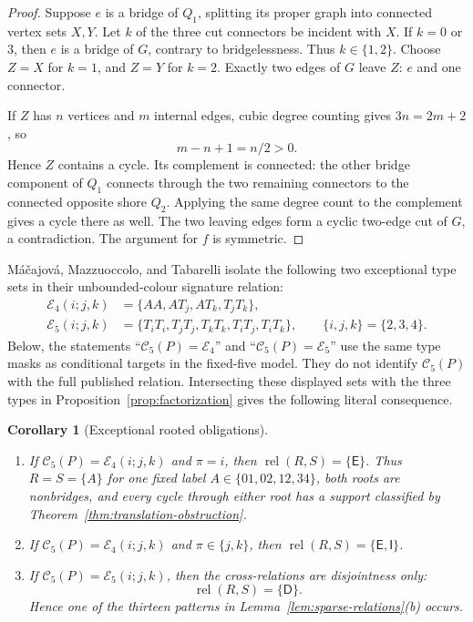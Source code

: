 \documentclass[11pt]{article}
\newtheorem{corollary}[theorem]{Corollary}
\theoremstyle{definition}
\theoremstyle{remark}
\begin{document}
\begin{proof}
Suppose \(e\) is a bridge of \(Q_1\), splitting its proper graph into
connected vertex sets \(X,Y\).  Let \(k\) of the three cut connectors
be incident with \(X\).  If \(k=0\) or \(3\), then \(e\) is a bridge of
\(G\), contrary to bridgelessness.  Thus \(k\in\{1,2\}\).  Choose
\(Z=X\) for \(k=1\), and \(Z=Y\) for \(k=2\).  Exactly two edges of
\(G\) leave \(Z\): \(e\) and one connector.

If \(Z\) has \(n\) vertices and \(m\) internal edges, cubic degree
counting gives \(3n=2m+2\), so
\[
 m-n+1=n/2>0.
\]
Hence \(Z\) contains a cycle.  Its complement is connected: the other
bridge component of \(Q_1\) connects through the two remaining
connectors to the connected opposite shore \(Q_2\).  Applying the same
degree count to the complement gives a cycle there as well.  The two
leaving edges form a cyclic two-edge cut of \(G\), a contradiction.
The argument for \(f\) is symmetric.
\end{proof}

M\'a\v cajov\'a, Mazzuoccolo, and Tabarelli
\cite{MacajovaEtAl2026} isolate the following two exceptional type sets
in their unbounded-colour signature relation:
\begin{equation}
\begin{aligned}
\mathcal E_4(i;j,k)&=\{AA,AT_j,AT_k,T_jT_k\},\\
\mathcal E_5(i;j,k)&=\{T_iT_i,T_jT_j,T_kT_k,T_iT_j,T_iT_k\},
 \qquad\{i,j,k\}=\{2,3,4\}.
\end{aligned}
\tag{6.10}
\end{equation}
Below, the statements ``\(\mathcal C_5(P)=\mathcal E_4\)'' and
``\(\mathcal C_5(P)=\mathcal E_5\)'' use the same type masks as
conditional targets in the fixed-five model.  They do not identify
\(\mathcal C_5(P)\) with the full published relation.
Intersecting these displayed sets with the three types in
Proposition~\ref{prop:factorization} gives the following literal
consequence.

\begin{corollary}[Exceptional rooted obligations]
\label{cor:exceptional-rooted}
\begin{enumerate}[label=(\roman*),leftmargin=2.4em]
\item If \(\mathcal C_5(P)=\mathcal E_4(i;j,k)\) and
\(\pi=i\), then
\(\operatorname{rel}(R,S)=\{\mathsf E\}\).  Thus
\(R=S=\{A\}\) for one fixed label
\(A\in\{01,02,12,34\}\), both roots are nonbridges, and every cycle
through either root has a support classified by
Theorem~\ref{thm:translation-obstruction}.
\item If \(\mathcal C_5(P)=\mathcal E_4(i;j,k)\) and
\(\pi\in\{j,k\}\), then
\(\operatorname{rel}(R,S)=\{\mathsf E,\mathsf I\}\).
\item If \(\mathcal C_5(P)=\mathcal E_5(i;j,k)\), then the
cross-relations are disjointness only:
\[
 \operatorname{rel}(R,S)=\{\mathsf D\}.
\]
Hence one of the thirteen patterns in
Lemma~\ref{lem:sparse-relations}(b) occurs.
\end{enumerate}
\end{corollary}
\end{document}
